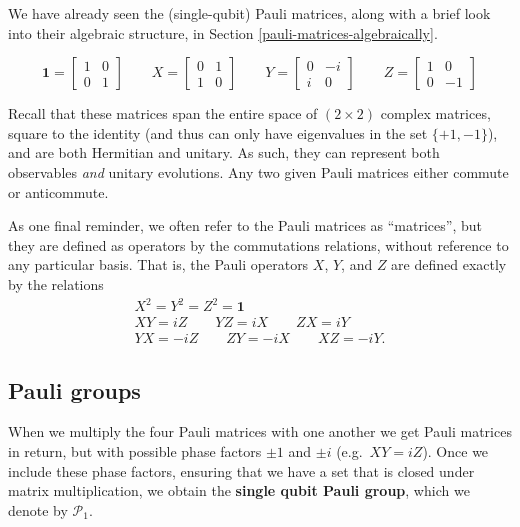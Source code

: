 \documentclass[fleqn,a4paper]{article}
\theoremstyle{definition}
\theoremstyle{definition}
\theoremstyle{definition}
\theoremstyle{definition}
\theoremstyle{remark}
\begin{document}
We have already seen the (single-qubit) Pauli matrices, along with a brief look into their algebraic structure, in Section \ref{pauli-matrices-algebraically}.

\[
  \mathbf{1}= \begin{bmatrix}1&0\\0&1\end{bmatrix}
  \qquad
  X = \begin{bmatrix}0&1\\1&0\end{bmatrix}
  \qquad
  Y = \begin{bmatrix}0&-i\\i&0\end{bmatrix}
  \qquad
  Z = \begin{bmatrix}1&0\\0&-1\end{bmatrix}
\]

Recall that these matrices span the entire space of \((2\times2)\) complex matrices, square to the identity (and thus can only have eigenvalues in the set \(\{+1,-1\}\)), and are both Hermitian and unitary.
As such, they can represent both observables \emph{and} unitary evolutions.
Any two given Pauli matrices either commute or anticommute.

As one final reminder, we often refer to the Pauli matrices as ``matrices'', but they are defined as operators by the commutations relations, without reference to any particular basis.
That is, the Pauli operators \(X\), \(Y\), and \(Z\) are defined exactly by the relations
\[
  \begin{gathered}
    X^2 = Y^2 = Z^2 = \mathbf{1}
  \\XY=iZ \qquad YZ=iX \qquad ZX=iY
  \\YX=-iZ \qquad ZY=-iX \qquad XZ=-iY.
  \end{gathered}
\]

\hypertarget{pauli-groups}{%
\subsection{Pauli groups}\label{pauli-groups}}

When we multiply the four Pauli matrices with one another we get Pauli matrices in return, but with possible phase factors \(\pm1\) and \(\pm i\) (e.g.~\(XY=iZ\)).
Once we include these phase factors, ensuring that we have a set that is closed under matrix multiplication, we obtain the \textbf{single qubit Pauli group}, which we denote by \(\mathcal{P}_1\).
\end{document}
